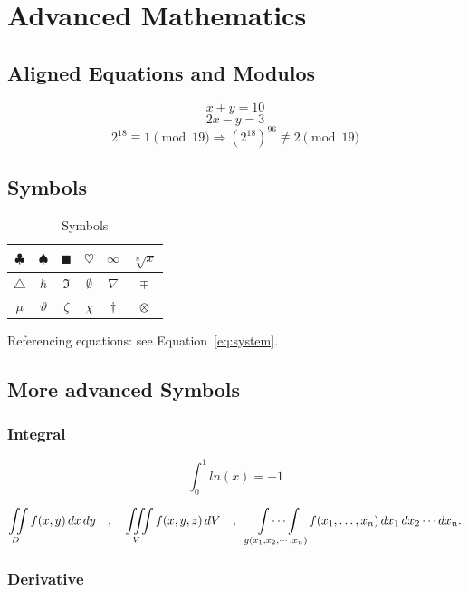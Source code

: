 \documentclass[12pt,a4paper]{article}
\begin{document}
\section{Advanced Mathematics}
\subsection{Aligned Equations and Modulos}

\begin{center}
    \[
    x+y=10
    \]
    \[
    2x-y=3
    \]
    \[
    2^{18}\equiv 1\pmod {19}\Longrightarrow (2^{18})^{96}\not\equiv 2\pmod{19}
    \]
\end{center}



\subsection{Symbols}
\begin{table}[h!]
  \centering
  \begin{tabular}{|c|c|c|c|c|c|}
    \hline
    $\clubsuit$ & $\spadesuit$ & $\blacksquare$ & $\heartsuit$ & $\infty$ & $\sqrt[n]{x}$ \\
    \hline
   $\triangle$ & $\hbar$ & $\Im$ & $\emptyset$ & $\nabla$ & $\mp$\\
    \hline
    $\mu$ & $\vartheta$ & $	\zeta$ & $	\chi$ & $\dagger$ & $\otimes$\\
    \hline
    
  \end{tabular}
  \caption{Symbols}
  \label{tab:simple}
\end{table}

Referencing equations: see Equation~\ref{eq:system}.

\subsection{More advanced Symbols}
\subsubsection{Integral}
\[
\int_{0}^{1} ln(x)=-1
\]

\[
  \iint\limits_D f(x,y)\,dx\,dy
  \quad,\quad
  \iiint\limits_V f(x,y,z)\,dV
  \quad,\quad
  \idotsint\limits_{g(x_1,x_2,\cdots,x_n)} f(x_1,\dots,x_n)\,dx_1\,dx_2\cdots dx_n.
\]

\subsubsection{Derivative}
\end{document}
